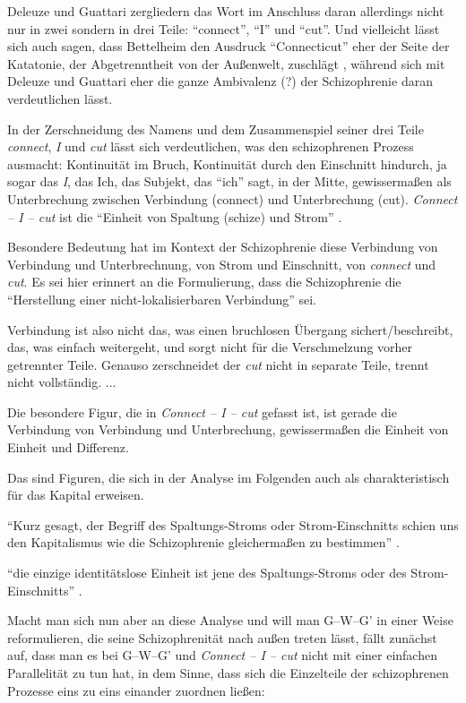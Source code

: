 \documentclass[12pt,
               DIV13,
               paper=a4,
               twoside=false,
               onehalfspacing,
               bibliography=totoc,
               toc=graduated,
               draft,
               ]{scrartcl}
\newcommand{\pc}[2]{\parencite[#1]{#2}}
\newcommand{\vgl}[2]{\parencite[vgl.][#1]{#2}}
\newcommand{\worries}[1]{\ifdraft{\textcolor{blue}{\texttt{(#1)}}}{}}
\newcommand{\gwg}{G--W--G'\xspace}
\newcommand{\cic}{Connect -- I -- cut\xspace}
\newcommand{\dg}{Deleuze und Guattari\xspace}
\begin{document}
\dg zergliedern das Wort im Anschluss daran allerdings nicht nur in
zwei sondern in drei Teile: \enquote{connect}, \enquote{I} und
\enquote{cut}. Und vielleicht lässt sich auch sagen, dass Bettelheim
den Ausdruck "`Connecticut"' eher der Seite der Katatonie, der
Abgetrenntheit von der Außenwelt, zuschlägt \vgl{403}{emptyf}, während
sich mit \dg eher die ganze Ambivalenz (?) der Schizophrenie
daran verdeutlichen lässt.

In der Zerschneidung des Namens und dem Zusammenspiel seiner drei
Teile \emph{connect}, \emph{I} und \emph{cut} lässt sich
verdeutlichen, was den schizophrenen Prozess ausmacht: Kontinuität im
Bruch, Kontinuität durch den Einschnitt hindurch, ja sogar das
\emph{I}, das Ich, das Subjekt, das "`ich"' sagt, in der Mitte,
gewissermaßen als Unterbrechung zwischen Verbindung (connect) und
Unterbrechung (cut). \emph{\cic} ist die "`Einheit von Spaltung
(schize) und Strom"' \pc{296}{ao}.

Besondere Bedeutung hat im Kontext der Schizophrenie diese Verbindung
von Verbindung und Unterbrechnung, von Strom und Einschnitt, von
\emph{connect} und \emph{cut}. Es sei hier erinnert an die
Formulierung, dass die Schizophrenie die "`Herstellung einer
nicht-lokalisierbaren Verbindung"' \pc{19}{schizg} sei.

Verbindung ist also nicht das, was einen bruchlosen Übergang
sichert/beschreibt, das, was einfach weitergeht, und sorgt nicht für
die Verschmelzung vorher getrennter Teile. Genauso zerschneidet der
\emph{cut} nicht in separate Teile, trennt nicht vollständig. ...

Die besondere Figur, die in \emph{\cic} gefasst ist, ist gerade die
Verbindung von Verbindung und Unterbrechung, gewissermaßen die Einheit
von Einheit und Differenz.

Das sind Figuren, die sich in der Analyse im Folgenden auch als
charakteristisch für das Kapital erweisen.

"`Kurz gesagt, der Begriff des Spaltungs-Stroms oder Strom-Einschnitts
schien uns den Kapitalismus wie die Schizophrenie gleichermaßen zu
bestimmen"' \pc{317}{ao}.

"`die einzige identitätslose Einheit ist jene des Spaltungs-Stroms
oder des Strom-Einschnitts"' \pc{314}{ao}.


Macht man sich nun aber an diese Analyse und will man \gwg in einer
Weise reformulieren, die seine Schizophrenität nach außen treten
lässt, fällt zunächst auf, dass man es bei \gwg und \emph{\cic} nicht
mit einer einfachen Parallelität zu tun hat, in dem Sinne, dass sich
die Einzelteile der schizophrenen Prozesse eins zu eins einander
zuordnen ließen:
\end{document}
